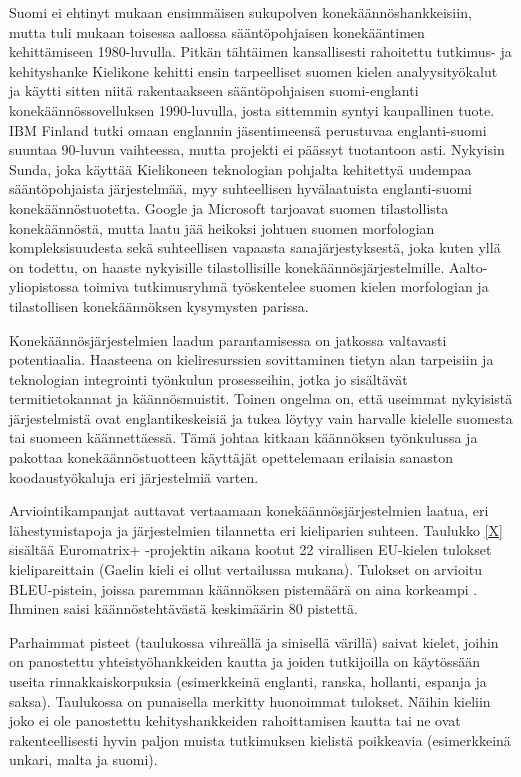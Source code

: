\documentclass[]{../../metanetpaper}
\begin{document}
\begin{multicols}{2}
Suomi ei ehtinyt mukaan ensimmäisen sukupolven konekäännöshankkeisiin,
mutta tuli mukaan toisessa aallossa sääntöpohjaisen konekääntimen
kehittämiseen 1980-luvulla. Pitkän tähtäimen kansallisesti rahoitettu
tutkimus- ja kehityshanke Kielikone kehitti ensin tarpeelliset suomen
kielen analyysityökalut ja käytti sitten niitä rakentaakseen
sääntöpohjaisen suomi-englanti konekäännössovelluksen 1990-luvulla,
josta sittemmin syntyi kaupallinen tuote. IBM Finland tutki omaan
englannin jäsentimeensä perustuvaa englanti-suomi suuntaa 90-luvun
vaihteessa, mutta projekti ei päässyt tuotantoon asti. Nykyisin Sunda,
joka käyttää Kielikoneen teknologian pohjalta kehitettyä uudempaa
sääntöpohjaista järjestelmää, myy suhteellisen hyvälaatuista
englanti-suomi konekäännöstuotetta. Google ja Microsoft tarjoavat
suomen tilastollista konekäännöstä, mutta laatu jää heikoksi johtuen
suomen morfologian kompleksisuudesta sekä suhteellisen vapaasta
sanajärjestyksestä, joka kuten yllä on todettu, on haaste nykyisille
tilastollisille konekäännösjärjestelmille. Aalto-yliopistossa toimiva
tutkimusryhmä työskentelee suomen kielen morfologian ja tilastollisen
konekäännöksen kysymysten parissa.

Konekäännösjärjestelmien laadun parantamisessa on jatkossa valtavasti
potentiaalia. Haasteena on kieliresurssien sovittaminen tietyn alan
tarpeisiin ja teknologian integrointi työnkulun prosesseihin, jotka jo
sisältävät termitietokannat ja käännösmuistit. Toinen ongelma on, että
useimmat nykyisistä järjestelmistä ovat englantikeskeisiä ja tukea
löytyy vain harvalle kielelle suomesta tai suomeen käännettäessä. Tämä
johtaa kitkaan käännöksen työnkulussa ja pakottaa konekäännöstuotteen
käyttäjät opettelemaan erilaisia sanaston koodaustyökaluja eri
järjestelmiä varten.

Arviointikampanjat auttavat vertaamaan konekäännösjärjestelmien
laatua, eri lähestymistapoja ja järjestelmien tilannetta eri
kieliparien suhteen. Taulukko \ref{X} sisältää Euromatrix+ -projektin aikana 
kootut 22 virallisen EU-kielen tulokset kielipareittain (Gaelin kieli ei ollut 
vertailussa mukana). Tulokset on arvioitu BLEU-pistein, joissa paremman 
käännöksen pistemäärä on aina korkeampi \cite{BLEU}. Ihminen saisi käännöstehtävästä
keskimäärin 80 pistettä.

Parhaimmat pisteet (taulukossa vihreällä ja sinisellä värillä) saivat
kielet, joihin on panostettu yhteistyöhankkeiden kautta ja joiden
tutkijoilla on käytössään useita rinnakkaiskorpuksia (esimerkkeinä
englanti, ranska, hollanti, espanja ja saksa). Taulukossa on
punaisella merkitty huonoimmat tulokset.  Näihin kieliin joko ei ole
panostettu kehityshankkeiden rahoittamisen kautta tai ne ovat
rakenteellisesti hyvin paljon muista tutkimuksen kielistä poikkeavia
(esimerkkeinä unkari, malta ja suomi).



\end{multicols}
\end{document}
